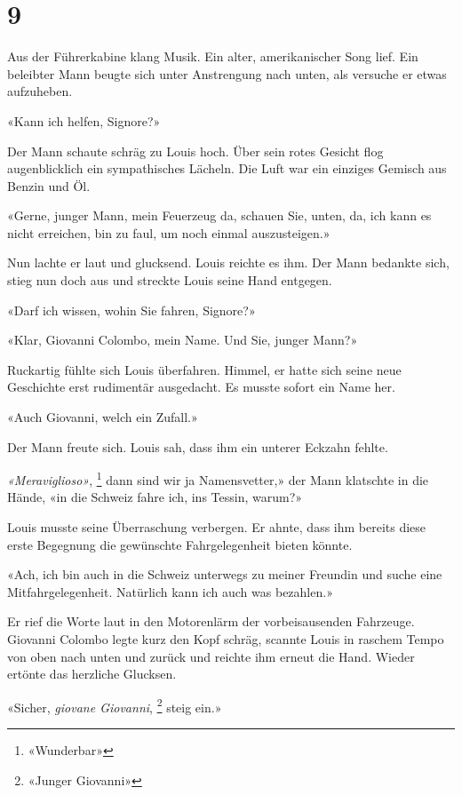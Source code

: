 \chapter{9}



Aus der Führerkabine klang Musik. Ein alter, amerikanischer Song lief.
Ein beleibter Mann beugte sich unter Anstrengung nach unten, als versuche
er etwas aufzuheben.

«Kann ich helfen, Signore?»

Der Mann schaute schräg zu Louis hoch. Über sein rotes Gesicht
flog augenblicklich ein sympathisches Lächeln. Die Luft war ein einziges
Gemisch aus Benzin und Öl.

«Gerne, junger Mann, mein Feuerzeug da, schauen Sie, unten, da, ich kann
es nicht erreichen, bin zu faul, um noch einmal auszusteigen.»

Nun lachte er laut und glucksend. Louis reichte es ihm.
Der Mann bedankte sich, stieg nun doch aus und streckte Louis seine Hand entgegen.

«Darf ich wissen, wohin Sie fahren, Signore?»

«Klar, Giovanni Colombo, mein Name. Und Sie, junger Mann?»

 Ruckartig fühlte sich Louis überfahren. Himmel, er hatte sich seine neue
Geschichte erst rudimentär ausgedacht. Es musste sofort ein Name her.

«Auch Giovanni, welch ein Zufall.»

Der Mann freute sich. Louis sah, dass ihm ein unterer Eckzahn fehlte.

\emph{«Meraviglioso»}, \footnote{«Wunderbar»} dann sind wir ja Namensvetter,» der Mann
klatschte in die Hände, «in die Schweiz fahre ich, ins Tessin, warum?»

Louis musste seine Überraschung verbergen. Er ahnte, dass ihm bereits
diese erste Begegnung die gewünschte Fahrgelegenheit bieten könnte.

«Ach, ich bin auch in die Schweiz unterwegs zu meiner Freundin und suche
eine Mitfahrgelegenheit. Natürlich kann ich auch was bezahlen.»

Er rief die Worte laut in den Motorenlärm der vorbeisausenden
Fahrzeuge.
Giovanni Colombo legte kurz den Kopf schräg, scannte Louis in raschem
Tempo von oben nach unten und zurück und reichte ihm erneut die Hand.
Wieder ertönte das herzliche Glucksen.

«Sicher, \emph{giovane Giovanni}, \footnote{«Junger Giovanni»} steig ein.»

